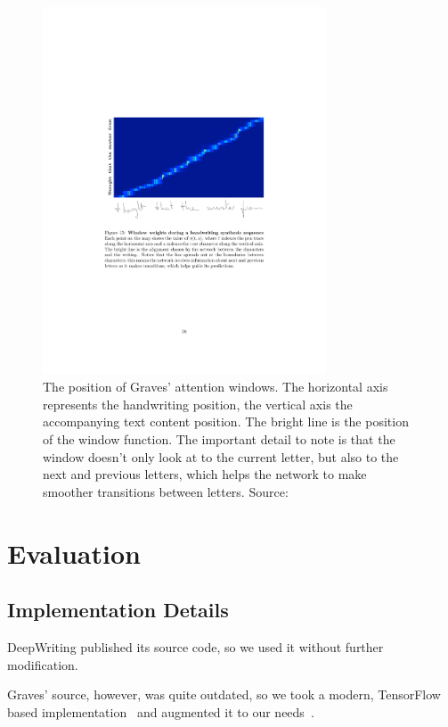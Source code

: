\begin{figure}
  \centering
  \includegraphics[width=0.75\textwidth]{../assets/style_transfer/graves_temporal_matching.pdf}
  \caption[The position of Graves' attention windows]{The position of Graves' attention windows. The horizontal axis represents the handwriting position, the vertical axis the accompanying text content position. The bright line is the position of the window function. The important detail to note is that the window doesn't only look at to the current letter, but also to the next and previous letters, which helps the network to make smoother transitions between letters. Source:~\cite{graves}}
  \label{fig:gravesTemporalMatching}
\end{figure}

\section{Evaluation}

\subsection{Implementation Details}
DeepWriting published its source code, so we used it without further modification.~\cite{deepwritingSource}

Graves' source, however, was quite outdated, so we took a modern, TensorFlow based implementation~\cite{gravesImplementation} and augmented it to our needs~\cite{gravesImplementationOurs}.

